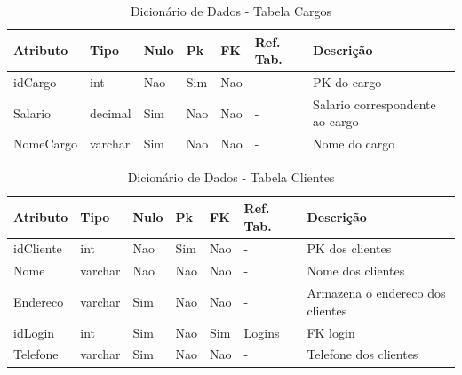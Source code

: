 \documentclass[
	12pt,				%
	openright,			%
	oneside,			%
	a4paper,			%
	chapter=TITLE,		%
	section=TITLE,		%
	english,			%
	brazil				%
	]{abntex2}
\begin{document}
    \begin{table}[htbp]
        \caption{Dicionário de Dados - Tabela Cargos}
        \label{tb1_dicionario_dados_cargos}
        \begin{tabular}{|l|l|l|l|l|l|p{3cm}|}
            \hline
            \textbf{Atributo} & 
            \textbf{Tipo} & 
            \textbf{Nulo} & 
            \textbf{Pk} & 
            \textbf{FK} & 
            \textbf{Ref. Tab.} & 
            \textbf{Descrição} \\ \hline
            idCargo & int & Nao & Sim & Nao & - & PK do cargo \\ \hline
            Salario & decimal & Sim & Nao & Nao & - & Salario correspondente ao cargo \\ \hline
            NomeCargo & varchar & Sim & Nao & Nao & - & Nome do cargo \\ \hline
        \end{tabular}
        
    \end{table}
    
    \begin{table}[htbp]
        \caption{Dicionário de Dados - Tabela Clientes}
        \label{tb1_dicionario_dados_clientes}
        \begin{tabular}{|l|l|l|l|l|l|p{3cm}|}
            \hline
            \textbf{Atributo} & 
            \textbf{Tipo} & 
            \textbf{Nulo} & 
            \textbf{Pk} & 
            \textbf{FK} & 
            \textbf{Ref. Tab.} & 
            \textbf{Descrição} \\ \hline
            idCliente & int & Nao & Sim & Nao & - & PK dos clientes \\ \hline
            Nome & varchar & Nao & Nao & Nao & - & Nome dos clientes \\ \hline
            Endereco & varchar & Sim & Nao & Nao & - & Armazena o endereco dos clientes \\ \hline
            idLogin & int & Sim & Nao & Sim & Logins & FK login \\ \hline
            Telefone & varchar & Sim & Nao & Nao & - & Telefone dos clientes \\ \hline
        \end{tabular}
    \end{table}
     
\end{document}
